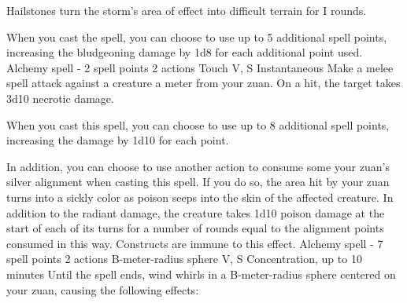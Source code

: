     Hailstones turn the storm's area of effect into difficult terrain for I rounds.

    When you cast the spell, you can choose to use up to 5 additional spell points, increasing the bludgeoning damage by 1d8 for each additional point used.
    {Alchemy spell - 2 spell points}
    {2 actions}
    {Touch}
    {V, S}
    {Instantaneous}
    Make a melee spell attack against a creature a meter from your zuan.
    On a hit, the target takes 3d10 necrotic damage.

    When you cast this spell, you can choose to use up to 8 additional spell points, increasing the damage by 1d10 for each point.

    In addition, you can choose to use another action to consume some your zuan's silver alignment when casting this spell.
    If you do so, the area hit by your zuan turns into a sickly color as poison seeps into the skin of the affected creature.
    In addition to the radiant damage, the creature takes 1d10 poison damage at the start of each of its turns for a number of rounds equal to the alignment points consumed in this way.
    Constructs are immune to this effect.
    {Alchemy spell - 7 spell points}
    {2 actions}
    {B-meter-radius sphere}
    {V, S}
    {Concentration, up to 10 minutes}
    Until the spell ends, wind whirls in a B-meter-radius sphere centered on your zuan, causing the following effects:

